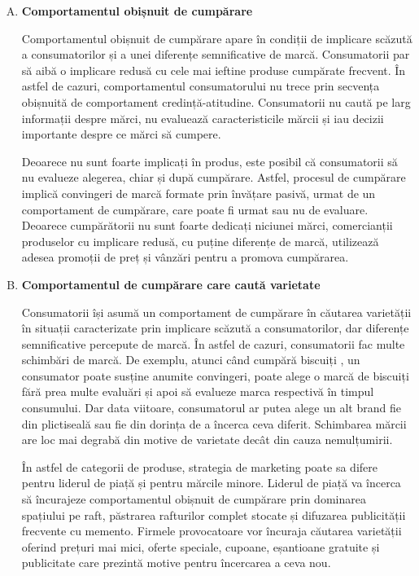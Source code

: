 \documentclass[a4paper, 12pt]{article}
\begin{document}
\begin{enumerate}[A)]
				\item \textbf{Comportamentul obișnuit de cumpărare}
				
				\quad Comportamentul obișnuit de cumpărare apare în condiții de implicare scăzută a consumatorilor și a unei diferențe semnificative de marcă. Consumatorii par să aibă o implicare redusă cu cele mai ieftine produse cumpărate frecvent. În astfel de cazuri, comportamentul consumatorului nu trece prin secvența obișnuită de comportament credință-atitudine. Consumatorii nu caută pe larg informații despre mărci, nu evaluează caracteristicile mărcii și iau decizii importante despre ce mărci să cumpere.
				
				\quad Deoarece nu sunt foarte implicați în produs, este posibil că consumatorii să nu evalueze alegerea, chiar și după cumpărare. Astfel, procesul de cumpărare implică convingeri de marcă formate prin învățare pasivă, urmat de un comportament de cumpărare, care poate fi urmat sau nu de evaluare. Deoarece cumpărătorii nu sunt foarte dedicați niciunei mărci, comercianții produselor cu implicare redusă, cu puține diferențe de marcă, utilizează adesea promoții de preț și vânzări pentru a promova cumpărarea.
				
				\item \textbf{Comportamentul de cumpărare care caută varietate}
				
				\quad Consumatorii își asumă un comportament de cumpărare în căutarea varietății în situații caracterizate prin implicare scăzută a consumatorilor, dar diferențe semnificative percepute de marcă. În astfel de cazuri, consumatorii fac multe schimbări de marcă. De exemplu, atunci când cumpără biscuiți , un consumator poate susține anumite convingeri, poate alege o marcă de biscuiți fără prea multe evaluări și apoi să evalueze marca respectivă în timpul consumului. Dar data viitoare, consumatorul ar putea alege un alt brand fie din plictiseală sau fie din dorința de a încerca ceva diferit. Schimbarea mărcii are loc mai degrabă din motive de varietate decât din cauza nemulțumirii.
				
				\quad În astfel de categorii de produse, strategia de marketing poate sa difere pentru liderul de piață și pentru mărcile minore. Liderul de piață va încerca să încurajeze comportamentul obișnuit de cumpărare prin dominarea spațiului pe raft, păstrarea rafturilor complet stocate și difuzarea publicității frecvente cu memento. Firmele provocatoare vor încuraja căutarea varietății oferind prețuri mai mici, oferte speciale, cupoane, eșantioane gratuite și publicitate care prezintă motive pentru încercarea a ceva nou.
			\end{enumerate}
			
\end{document}
